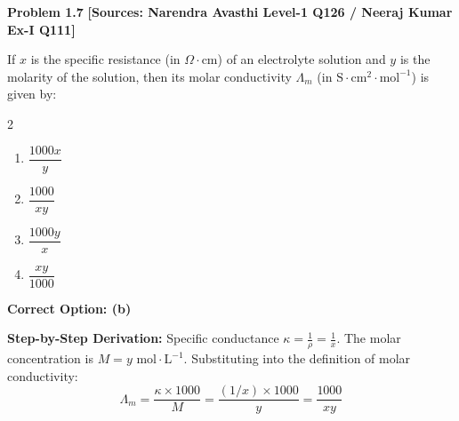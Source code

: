 \begin{problembox}
\textbf{Problem 1.7} \hfill \textbf{[Sources: Narendra Avasthi Level-1 Q126 / Neeraj Kumar Ex-I Q111]}

If $x$ is the specific resistance (in $\Omega\cdot\text{cm}$) of an electrolyte solution and $y$ is the molarity of the solution, then its molar conductivity $\Lambda_m$ (in $\text{S}\cdot\text{cm}^2\cdot\text{mol}^{-1}$) is given by:
\begin{multicols}{2}
\begin{enumerate}[label=(\alph*)]
    \item $\dfrac{1000 x}{y}$
    \item $\dfrac{1000}{x y}$
    \item $\dfrac{1000 y}{x}$
    \item $\dfrac{x y}{1000}$
\end{enumerate}
\end{multicols}
\end{problembox}
\begin{solution}
\textbf{Correct Option: (b)}

\textbf{Step-by-Step Derivation:}
Specific conductance $\kappa = \frac{1}{\rho} = \frac{1}{x}$.
The molar concentration is $M = y\text{ mol}\cdot\text{L}^{-1}$.
Substituting into the definition of molar conductivity:
\begin{equation*}
    \Lambda_m = \frac{\kappa \times 1000}{M} = \frac{(1/x) \times 1000}{y} = \frac{1000}{x y}
\end{equation*}
\end{solution}

